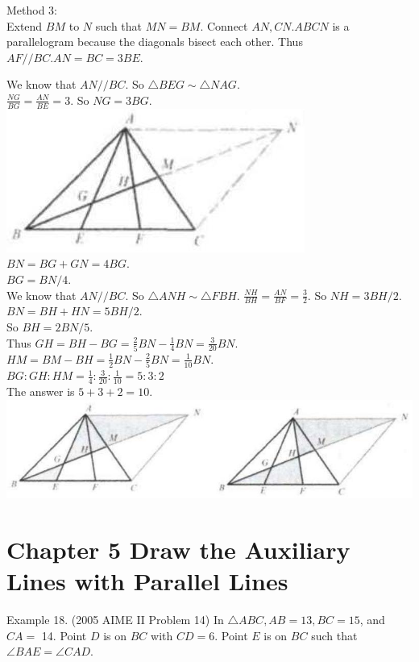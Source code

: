 \documentclass[10pt]{article}
\begin{document}
Method 3:\\
Extend \(B M\) to \(N\) such that \(M N=B M\). Connect \(A N, C N . A B C N\) is a parallelogram because the diagonals bisect each other. Thus \(A F / / B C . A N=B C=3 B E\).

We know that \(A N / / B C\). So \(\triangle B E G \sim \triangle N A G\).\\
\(\frac{N G}{B G}=\frac{A N}{B E}=3\). So \(N G=3 B G\).\\
\includegraphics[max width=\textwidth, center]{2025_04_17_97bc1f7e44d93c271a88g-120(1)}\\
\(B N=B G+G N=4 B G\).\\
\(B G=B N / 4\).\\
We know that \(A N / / B C\). So \(\triangle A N H \sim \triangle F B H\). \(\frac{N H}{B H}=\frac{A N}{B F}=\frac{3}{2}\). So \(N H=3 B H / 2\).\\
\(B N=B H+H N=5 B H / 2\).\\
So \(B H=2 B N / 5\).\\
Thus \(G H=B H-B G=\frac{2}{5} B N-\frac{1}{4} B N=\frac{3}{20} B N\).\\
\(H M=B M-B H=\frac{1}{2} B N-\frac{2}{5} B N=\frac{1}{10} B N\).\\
\(B G: G H: H M=\frac{1}{4}: \frac{3}{20}: \frac{1}{10}=5: 3: 2\)\\
The answer is \(5+3+2=10\).\\
\includegraphics[max width=\textwidth, center]{2025_04_17_97bc1f7e44d93c271a88g-120}

\section*{Chapter 5 Draw the Auxiliary Lines with Parallel Lines}
Example 18. (2005 AIME II Problem 14) In \(\triangle A B C, A B=13, B C=15\), and \(C A=\) 14. Point \(D\) is on \(B C\) with \(C D=6\). Point \(E\) is on \(B C\) such that \(\angle B A E=\angle C A D\).
\end{document}

